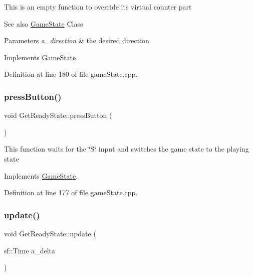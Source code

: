 This is an empty function to override it\textquotesingle{}s virtual counter part \begin{DoxySeeAlso}{See also}
\hyperlink{class_game_state}{Game\+State} Class 
\end{DoxySeeAlso}

\begin{DoxyParams}{Parameters}
{\em a\+\_\+direction} & the desired direction \\
\hline
\end{DoxyParams}


Implements \hyperlink{class_game_state_aaae8c1b3ae6969eb2dd81bfc12fbf43f}{Game\+State}.



Definition at line 180 of file game\+State.\+cpp.

\mbox{\label{class_get_ready_state_a414a505ec783b1bf577b1b859abaee46}} 
\subsubsection{\texorpdfstring{press\+Button()}{pressButton()}}
{\footnotesize\ttfamily void Get\+Ready\+State\+::press\+Button (\begin{DoxyParamCaption}{ }\end{DoxyParamCaption})\hspace{0.3cm}{\ttfamily [virtual]}}

This function waits for the \char`\"{}\+S\char`\"{} input and switches the game state to the playing state 

Implements \hyperlink{class_game_state_aa14eeaf244bcf19b7013af75cb722dde}{Game\+State}.



Definition at line 177 of file game\+State.\+cpp.

\mbox{\label{class_get_ready_state_a6e5a1035b4ee7a52aa28027a0b99dd8a}} 
\subsubsection{\texorpdfstring{update()}{update()}}
{\footnotesize\ttfamily void Get\+Ready\+State\+::update (\begin{DoxyParamCaption}\item[{sf\+::\+Time}]{a\+\_\+delta }\end{DoxyParamCaption})\hspace{0.3cm}{\ttfamily [virtual]}}

